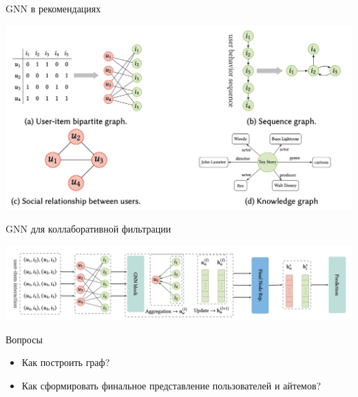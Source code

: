 \documentclass[11pt,aspectratio=169,handout]{beamer}
\begin{document}
\begin{frame}{GNN в рекомендациях \cite{GNNSURVEY}}

\begin{center}
\includegraphics[scale=0.3]{images/gnn-rec-problems.png}
\end{center}

\end{frame}

\begin{frame}{GNN для коллаборативной фильтрации}

\begin{center}
\includegraphics[scale=0.3]{images/gnn-cf.png}
\end{center}

Вопросы
\begin{itemize}
\item Как построить граф?
\item Как сформировать финальное представление пользователей и айтемов?
\end{itemize}

\end{frame}
\end{document}
